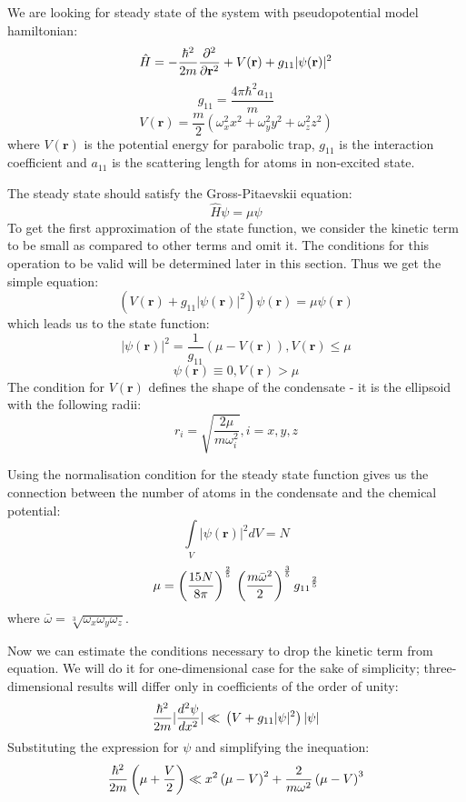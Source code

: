\documentclass[12pt,notitlepage]{report}
\author{Bogdan Opanchuk}
\begin{document}
We are looking for steady state of the system with pseudopotential model hamiltonian:
\[ 
\hat{H} = -\frac{\hbar^2}{2m} \frac{\partial^2}{\partial \mathbf{r}^2} + \\
V(\mathbf{r}) + \\
g_{11} \vert \psi(\mathbf{r}) \vert^2 
\]
\[g_{11} = \frac{4 \pi \hbar^2 a_{11}}{m}\]
\[ V(\mathbf{r}) = \frac{m}{2} \left( \omega_x^2 x^2 + \omega_y^2 y^2 + \omega_z^2 z^2 \right) \]
where $V(\mathbf{r})$ is the potential energy for parabolic trap, $g_{11}$ is the interaction coefficient
and $a_{11}$ is the scattering length for atoms in non-excited state.

The steady state should satisfy the Gross-Pitaevskii equation:
\[ \hat{H} \psi = \mu \psi \]
To get the first approximation of the state function, we consider the kinetic term to be small as compared to other terms and omit it. The conditions for this operation to be valid will be determined later in this section. Thus we get the simple equation:
\[ \left( V(\mathbf{r}) + g_{11} \vert \psi(\mathbf{r}) \vert^2 \right) \psi(\mathbf{r}) = \mu \psi(\mathbf{r}) \]
which leads us to the state function:
\[ \vert \psi(\mathbf{r}) \vert^2 = \frac{1}{g_{11}} \left( \mu - V(\mathbf{r}) \right), V(\mathbf{r}) \leq \mu \]
\[ \psi(\mathbf{r}) \equiv 0, V(\mathbf{r}) > \mu \]
The condition for $V(\mathbf{r})$ defines the shape of the condensate - it is the ellipsoid with the following radii:
\[ r_i = \sqrt{\frac{2 \mu}{m \omega_i^2}}, i = x, y, z \]

Using the normalisation condition for the steady state function gives us the connection between the number of atoms in the condensate and the chemical potential:
\[ \int\limits_{V} \vert \psi(\mathbf{r}) \vert^2 dV = N \]
\[ 
\mu = \left( \frac{15 N}{8 \pi} \right)^\frac{2}{5} \\
\left( \frac{m \bar{\omega}^2}{2} \right)^\frac{3}{5} \\
{g_{11}}^\frac{2}{5}
\]
where $\bar{\omega} = \sqrt[3]{\omega_x \omega_y \omega_z}$.

Now we can estimate the conditions necessary to drop the kinetic term from equation. We will do it for one-dimensional case for the sake of simplicity; three-dimensional results will differ only in coefficients of the order of unity:
\[ 
\frac{\hbar^2}{2 m} \vert \frac{d^2 \psi}{d x^2} \vert \ll \\
\left( V + g_{11} \vert \psi \vert^2 \right) \vert \psi \vert
\]
Substituting the expression for $\psi$ and simplifying the inequation:
\[
\frac{\hbar^2}{2 m} \left( \mu + \frac{V}{2} \right) \ll \\
x^2 \left( \mu - V \right)^2 + \frac{2}{m \omega^2} \left( \mu - V \right)^3
\]
\end{document}
